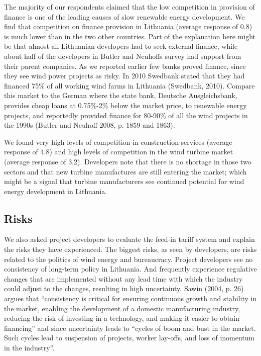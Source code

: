 \documentclass[a4paper, 12pt]{article}
\begin{document}
The majority of our respondents claimed that the low competition in provision of finance is one of the leading causes of slow renewable energy development. We find that competition on finance provision in Lithuania (average response of 0.8) is much lower than in the two other countries. Part of the explanation here might be that almost all Lithuanian developers had to seek external finance, while about half of the developers in Butler and Neuhoffs survey had support from their parent companies. As we reported earlier few banks proved finance, since they see wind power projects as risky. In 2010 Swedbank stated that they had financed 75\% of all working wind farms in Lithuania (Swedbank, 2010). Compare this market to the German where the state bank, Deutsche Ausgleichsbank, provides cheap loans at 0.75\%-2\% below the market price, to renewable energy projects, and reportedly provided finance for 80-90\% of all the wind projects in the 1990s (Butler and Neuhoff 2008, p. 1859 and 1863).

We found very high levels of competition in construction services (average response of 4.8) and high levels of competition in the wind turbine market (average response of 3.2). Developers note that there is no shortage in those two sectors and that new turbine manufactures are still entering the market; which might be a signal that turbine manufacturers see continued potential for wind energy development in Lithuania. 

\subsection{Risks}
We also asked project developers to evaluate the feed-in tariff system and explain the risks they have experienced. The biggest risks, as seen by developers, are risks related to the politics of wind energy and bureaucracy. Project developers see no consistency of long-term policy in Lithuania. And frequently experience regulative changes that are implemented without any lead time with which the industry could adjust to the changes, resulting in high uncertainty. Sawin (2004, p. 26) argues that ``consistency is critical for ensuring continuous growth and stability in the market, enabling the development of a domestic manufacturing industry, reducing the risk of investing in a technology, and making it easier to obtain financing'' and since uncertainty leads to ``cycles of boom and bust in the market. Such cycles lead to suspension of projects, worker lay-offs, and loss of momentum in the industry''.
\end{document}
